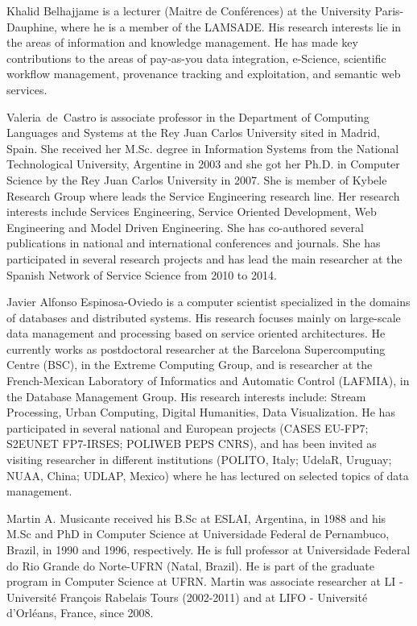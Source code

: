 \documentclass{singlecol-new}
\theoremstyle{TH}{
\newtheorem{lemma}{Lemma}
\newtheorem{theorem}[lemma]{Theorem}
\newtheorem{corrolary}[lemma]{Corrolary}
\newtheorem{conjecture}[lemma]{Conjecture}
\newtheorem{proposition}[lemma]{Proposition}
\newtheorem{claim}[lemma]{Claim}
\newtheorem{stheorem}[lemma]{Wrong Theorem}
\newtheorem{algorithm}{Algorithm}
}
\theoremstyle{THrm}{
\newtheorem{definition}{Definition}[section]
\newtheorem{question}{Question}[section]
\newtheorem{remark}{Remark}
\newtheorem{scheme}{Scheme}
}
\theoremstyle{THhit}{
\newtheorem{case}{Case}[section]
}
\theoremstyle{THhsl}{
\newtheorem{example}{Example}
}
\begin{document}
\begin{bio}
Khalid Belhajjame is a lecturer (Maitre de Conf\'erences) at the University Paris-Dauphine, where he is a member of the LAMSADE. His research interests lie in the areas of information and knowledge management. He has made key contributions to the areas of pay-as-you data integration, e-Science, scientific workflow management, provenance tracking and exploitation, and semantic web services.

\noindent Valeria~de~Castro is associate professor in the Department of Computing Languages and Systems at the Rey Juan Carlos University sited in Madrid, Spain. She received her M.Sc. degree in Information Systems from the National Technological University, Argentine in 2003 and she got her Ph.D. in Computer Science by the Rey Juan Carlos University in 2007. She is member of Kybele Research Group where leads the Service Engineering research line. Her research interests include Services Engineering, Service Oriented Development, Web Engineering and Model Driven Engineering. She has co-authored several publications in national and international conferences and journals. She has participated in several research projects and has lead the main researcher at the Spanish Network of Service Science from 2010 to 2014.

\noindent Javier Alfonso Espinosa-Oviedo is a computer scientist specialized in the domains of databases and distributed systems. His research focuses mainly on large-scale data management and processing based on service oriented architectures. He currently works as postdoctoral researcher at the Barcelona Supercomputing Centre (BSC), in the Extreme Computing Group, and is researcher at the French-Mexican Laboratory of Informatics and Automatic Control (LAFMIA), in the Database Management Group. His research interests include: Stream Processing, Urban Computing, Digital Humanities, Data Visualization. He has participated in several national and European projects (CASES EU-FP7; S2EUNET FP7-IRSES; POLIWEB PEPS CNRS), and has been invited as visiting researcher in different institutions (POLITO, Italy; UdelaR, Uruguay; NUAA, China; UDLAP, Mexico) where he has lectured on selected topics of data management.

\noindent Martin A. Musicante received his B.Sc at ESLAI, Argentina, in 1988 and his M.Sc and PhD in Computer Science at Universidade Federal de Pernambuco, Brazil, in 1990 and 1996, respectively. He is full professor at Universidade Federal do Rio Grande do Norte-UFRN (Natal, Brazil). He is part of the graduate program in Computer Science at UFRN. Martin was associate researcher at LI - Universit\'e Fran\c{c}ois Rabelais Tours (2002-2011) and at LIFO - Universit\'e d'Orl\'eans, France, since 2008. 


\end{bio}
\end{document}
